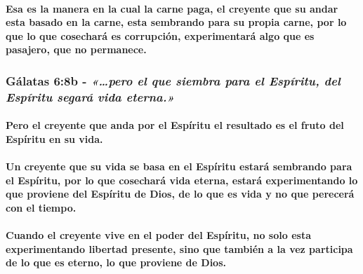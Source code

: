 \documentclass[11a pt,twoside]{article}
\newcommand{\scripture}[1]{%
  {\fontsize{12pt}{16pt}\selectfont\ScriptureFont\itshape #1}%
}
\let\oldsubsubsection\subsubsection
\renewcommand{\subsubsection}{\needspace{4\baselineskip}\oldsubsubsection}
\let\oldparagraph\paragraph
\renewcommand{\paragraph}{\needspace{3\baselineskip}\oldparagraph}
\begin{document}
\paragraph{Esa es la manera en la cual la carne paga, el creyente que su
andar esta basado en la carne, esta sembrando para su propia carne, por
lo que lo que cosechará es corrupción, experimentará algo que es
pasajero, que no
permanece.}\label{esa-es-la-manera-en-la-cual-la-carne-paga-el-creyente-que-su-andar-esta-basado-en-la-carne-esta-sembrando-para-su-propia-carne-por-lo-que-lo-que-cosecharuxe1-es-corrupciuxf3n-experimentaruxe1-algo-que-es-pasajero-que-no-permanece.}

\subsubsection{\texorpdfstring{Gálatas 6:8b -
\scripture{«…pero el que siembra para el Espíritu, del Espíritu segará vida eterna.»}}{Gálatas 6:8b - }}\label{guxe1latas-68b---pero-el-que-siembra-para-el-espuxedritu-del-espuxedritu-segaruxe1-vida-eterna.}

\paragraph{Pero el creyente que anda por el Espíritu el resultado es el
fruto del Espíritu en su
vida.}\label{pero-el-creyente-que-anda-por-el-espuxedritu-el-resultado-es-el-fruto-del-espuxedritu-en-su-vida.}

\paragraph{Un creyente que su vida se basa en el Espíritu estará
sembrando para el Espíritu, por lo que cosechará vida eterna, estará
experimentando lo que proviene del Espíritu de Dios, de lo que es vida y
no que perecerá con el
tiempo.}\label{un-creyente-que-su-vida-se-basa-en-el-espuxedritu-estaruxe1-sembrando-para-el-espuxedritu-por-lo-que-cosecharuxe1-vida-eterna-estaruxe1-experimentando-lo-que-proviene-del-espuxedritu-de-dios-de-lo-que-es-vida-y-no-que-pereceruxe1-con-el-tiempo.}

\paragraph{Cuando el creyente vive en el poder del Espíritu, no solo
esta experimentando libertad presente, sino que también a la vez
participa de lo que es eterno, lo que proviene de
Dios.}\label{cuando-el-creyente-vive-en-el-poder-del-espuxedritu-no-solo-esta-experimentando-libertad-presente-sino-que-tambiuxe9n-a-la-vez-participa-de-lo-que-es-eterno-lo-que-proviene-de-dios.}
\end{document}
